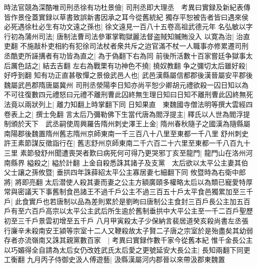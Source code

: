 時法官競為深酷唯司刑丞徐有功杜景儉|{
	司刑丞即大理丞　考異曰實録及新紀表傳皆作景佺蓋實録以草書致誤新書因承之耳今從舊統紀}
獨存平恕被告者皆曰遇來侯必死遇徐杜必生有功文遠之孫也|{
	徐文遠見一百八十五卷高祖武德元年}
名弘敏以字行初為蒲州司法|{
	唐制法曹司法參軍掌鞫獄麗法督盗賊知贓賄没入}
以寛為治|{
	治直吏翻}
不施敲朴吏相約有犯徐司法杖者衆共斥之迨官滿不杖一人職事亦修累遷司刑丞酷吏所誣搆者有功皆為直之|{
	為于偽翻下右為同}
前後所活數十百家嘗廷争獄事太后厲色詰之|{
	結去吉翻}
左右為戰栗有功神色不撓|{
	撓奴教翻}
争之彌切太后雖好殺|{
	好呼到翻}
知有功正直甚敬憚之景儉武邑人也|{
	武邑漢縣屬信都郡後漢晉屬安平郡後魏屬武邑郡隋唐屬冀州}
司刑丞滎陽李日知亦尚平恕少卿胡元禮欲殺一囚日知以為不可往復數四元禮怒曰元禮不離刑曹此囚終無生理日知曰日知不離刑曹此囚終無死法竟以兩狀列上|{
	離力知翻上時掌翻下同}
日知果直　東魏國寺僧法明等撰大雲經四卷表上之|{
	撰士免翻}
言太后乃彌勒佛下生當代唐為閻浮提主|{
	釋氏以人世為閻浮提}
制頒於天下　武丞嗣使周興羅告隋州刺史澤王上金|{
	隋州春秋隨子之國漢為隨縣屬南陽郡後魏置隋州舊志隋州京師東南一千三百八十八里至東都一千八里}
舒州刺史許王素節謀反徵詣行在|{
	舊志舒州京師東南二千六百二十六里至東都一千八百九十三里}
素節發舒州聞遭喪哭者歎曰病死何可得乃更哭邪丁亥至龍門|{
	龍門山在洛州河南縣界}
縊殺之|{
	縊於計翻}
上金自殺悉誅其諸子及支黨　太后欲以太平公主妻其伯父士讓之孫攸暨|{
	垂拱四年誅薛紹太平公主寡居妻七細翻下同}
攸暨時為右衛中郎將|{
	將即亮翻}
太后潜使人殺其妻而妻之公主方額廣頤多權略太后以為類已寵愛特厚常與密議天下事舊制食邑諸王不過千戶公主不過三百五十戶太平食邑獨累加至三千戶|{
	此食實戶也若唐制以品為差則累於是劉昫曰唐制公主食封三百戶長公主加五百戶有至六百戶高宗以太平公主武后所生逾於舊制垂拱中大平公主至一千二百戶聖歷初至三千戶景雲初增至五千戶}
八月甲寅殺太子少保納言裴居道癸亥殺尚書左丞張行廉辛未殺南安王潁等宗室十二人又鞭殺故太子賢二子唐之宗室於是殆盡矣其幼弱存者亦流嶺南又誅其親黨數百家　|{
	考異曰實録作數千家今從舊本紀}
惟千金長公主以巧媚得全自請為太后女仍改姓武氏太后愛之更號延安大長公主|{
	長知兩翻下同更工衡翻}
九月丙子侍御史汲人傅遊藝|{
	汲縣漢屬河内郡晉以來帶汲郡東魏置}


